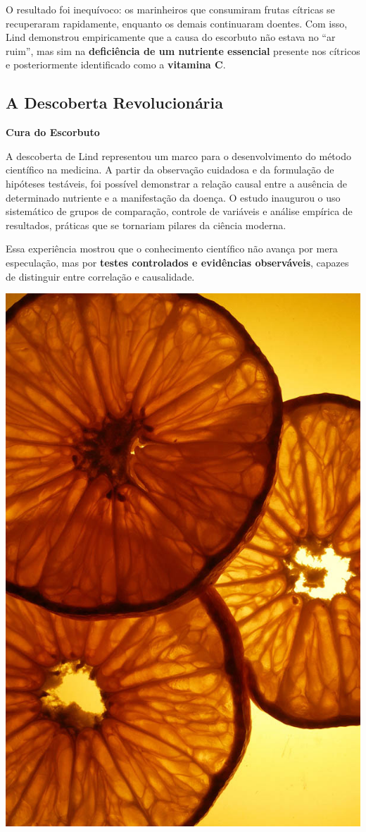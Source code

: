 \documentclass[
  letterpaper,
  DIV=11,
  numbers=noendperiod]{scrreprt}
\begin{document}
O resultado foi inequívoco: os marinheiros que consumiram frutas
cítricas se recuperaram rapidamente, enquanto os demais continuaram
doentes. Com isso, Lind demonstrou empiricamente que a causa do
escorbuto não estava no ``ar ruim'', mas sim na \textbf{deficiência de
um nutriente essencial} presente nos cítricos e posteriormente
identificado como a \textbf{vitamina C}.

\subsection{A Descoberta
Revolucionária}\label{a-descoberta-revolucionuxe1ria}

\textbf{Cura do Escorbuto}

A descoberta de Lind representou um marco para o desenvolvimento do
método científico na medicina. A partir da observação cuidadosa e da
formulação de hipóteses testáveis, foi possível demonstrar a relação
causal entre a ausência de determinado nutriente e a manifestação da
doença. O estudo inaugurou o uso sistemático de grupos de comparação,
controle de variáveis e análise empírica de resultados, práticas que se
tornariam pilares da ciência moderna.

Essa experiência mostrou que o conhecimento científico não avança por
mera especulação, mas por \textbf{testes controlados e evidências
observáveis}, capazes de distinguir entre correlação e causalidade.

\includegraphics[width=0.6\linewidth,height=\textheight,keepaspectratio]{figuras0/citrus.jpg}
\end{document}
